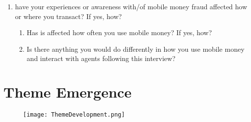 \begin{appendices}
\begin{enumerate}
    \item have your experiences or awareness with/of mobile money fraud affected how or where you transact? If yes, how?
    \begin{enumerate}
        \item Has is affected how often you use mobile money? If yes, how?
        \item Is there anything you would do differently in how you use mobile money and interact with agents following this interview? 
    \end{enumerate} 
    
\end{enumerate}

\section{Theme Emergence}
\label{Appendix_ThemeEmergence}
\begin{figure}[!ht]
\texttt{[image: ThemeDevelopment.png]}
\label{ThemeEmergence}
\end{figure}
\end{appendices}